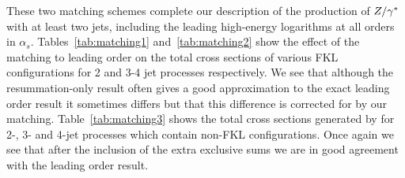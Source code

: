 	These two matching schemes complete our description of the production of $Z/\gamma^*$
	with at least two jets, including the leading high-energy logarithms at all
	orders in $\alpha_s$.  Tables~\eqref{tab:matching1} and~\eqref{tab:matching2} show
	the effect of the matching to leading order on the total cross sections of various FKL
	configurations for 2 and 3-4 jet processes respectively.  We see that although the
	resummation-only result often gives a good approximation to the exact leading order result
	it sometimes differs but that this difference is corrected for by our matching.  Table~\eqref{tab:matching3}
	shows the total cross sections generated by \HEJ for 2-, 3- and 4-jet processes which contain non-FKL
	configurations.  Once again we see that after the inclusion of the extra exclusive sums we are in good
	agreement with the leading order result.

